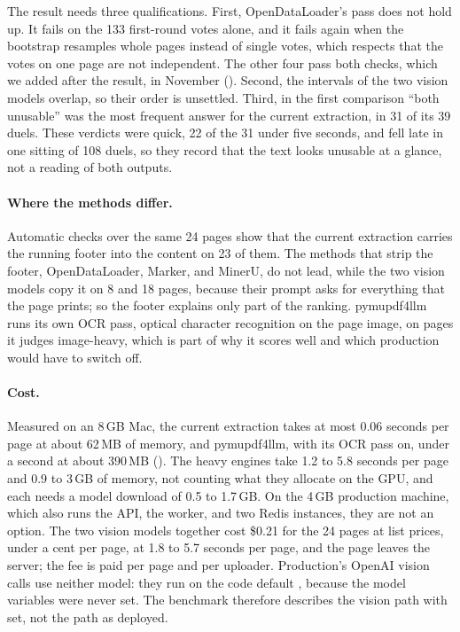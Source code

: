 The result needs three qualifications. First, OpenDataLoader's pass does not
hold up. It fails on the 133 first-round votes alone, and it fails again when
the bootstrap resamples whole pages instead of single votes, which respects
that the votes on one page are not independent. The other four pass both
checks, which we added after the result, in November
().
Second, the intervals of the two vision models overlap, so their order is
unsettled. Third, in the first comparison ``both unusable'' was the most
frequent answer for the current extraction, in 31 of its 39 duels. These
verdicts were quick, 22 of the 31 under five seconds, and fell late in one
sitting of 108 duels, so they record that the text looks unusable at a glance,
not a reading of both outputs.

\paragraph{Where the methods differ.} Automatic checks over the same 24 pages
show that the current extraction carries the running footer into the content
on 23 of them. The methods that strip the footer, OpenDataLoader, Marker, and
MinerU, do not lead, while the two vision models copy it on 8 and 18 pages,
because their prompt asks for everything that the page prints; so the footer
explains only part of the ranking. pymupdf4llm runs
its own OCR pass, optical character recognition on the page image, on pages it
judges image-heavy, which is part of why it scores well and which production
would have to switch off.

\paragraph{Cost.} Measured on an 8\,GB Mac, the current extraction takes at
most 0.06 seconds per page at about 62\,MB of memory, and pymupdf4llm, with its
OCR pass on, under a second at about 390\,MB
().
The heavy engines take 1.2 to 5.8 seconds per page and 0.9 to 3\,GB of memory,
not counting what they allocate on the GPU, and each needs a model download of
0.5 to 1.7\,GB. On the 4\,GB production machine, which also runs the API, the
worker, and two Redis instances, they are not an option. The two vision models
together cost \$0.21 for the 24 pages at list prices, under a cent per page,
at 1.8 to 5.7 seconds per page, and the page leaves the server; the fee is
paid per page and per uploader. Production's OpenAI vision calls use neither
model: they run on the code default , because the model
variables were never set. The benchmark therefore describes the vision path
with  set, not the path as deployed.

